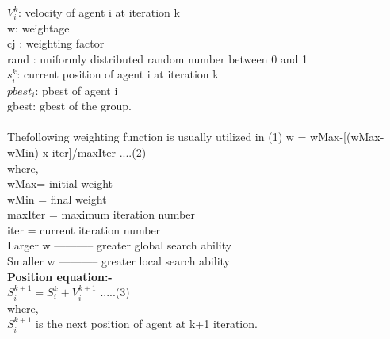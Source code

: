 $V_{i}^{k}$: velocity of  agent i at iteration k\\                                                                                                  w: weightage\\                                                                                                                                                                                             cj : weighting factor\\                                                                                                                        rand : uniformly distributed random number between 0 and 1\\                                                                             $s_{i}^{k}$: current position of agent i at iteration k\\                                                                                                   $pbest_{i}$: pbest of agent i\\                                                                                                                           gbest: gbest of the group.\\ \\
Thefollowing weighting function is usually utilized in (1)
w = wMax-[(wMax-wMin) x iter]/maxIter ....(2)\\
where,\\
wMax= initial weight\\
wMin = final weight\\
maxIter = maximum iteration number\\
iter = current iteration number\\
Larger w ----------- greater global search ability\\
Smaller w ----------- greater local search ability\\ 
\textbf{Position equation:- }    \\
$S_{i}^{k+1} = S_{i}^{k} + V_{i}^{k+1}$ .....(3)\\
where,\\
$S_{i}^{k+1}$ is the next position of agent at k+1 iteration.                                                                           
